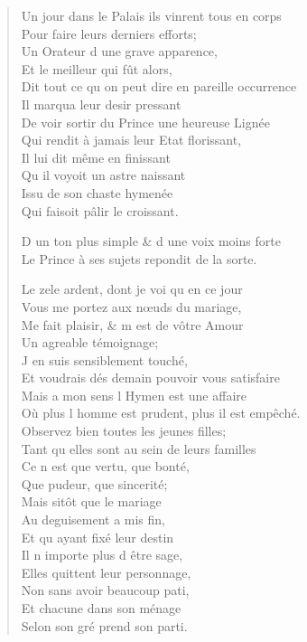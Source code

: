 \begin{verse}
Un jour dans le Palais ils vinrent tous en corps \\
\vin Pour faire leurs derniers efforts; \\
\vin Un Orateur d\textquotesingle{} une grave apparence, \\
\vin Et le meilleur qui fût alors, \\
Dit tout ce qu\textquotesingle{} on peut dire en pareille occurrence \\
\vin Il marqua leur desir pressant \\
De voir sortir du Prince une heureuse Lignée \\
Qui rendit à jamais leur Etat florissant, \\
\vin Il lui dit même en finissant \\
\vin Qu\textquotesingle{} il voyoit un astre naissant \\
\vin Issu de son chaste hymenée \\
\vin Qui faisoit pâlir le croissant.

D\textquotesingle{} un ton plus simple \& d\textquotesingle{} une voix moins forte \\
Le Prince à ses sujets repondit de la sorte.

\vin Le zele ardent, dont je voi qu\textquotesingle{} en ce jour \\
\vin Vous me portez aux nœuds du mariage, \\
\vin Me fait plaisir, \& m\textquotesingle{} est de vôtre Amour \\
\vin Un agreable témoignage; \\
\vin J\textquotesingle{} en suis sensiblement touché, \\
Et voudrais dés demain pouvoir vous satisfaire \\
\vin Mais a mon sens l\textquotesingle{} Hymen est une affaire \\
Où plus l\textquotesingle{} homme est prudent, plus il est empêché. \\
\vin Observez bien toutes les jeunes filles; \\
\vin Tant qu\textquotesingle{} elles sont au sein de leurs familles \\
\vin Ce n\textquotesingle{} est que vertu, que bonté, \\
\vin Que pudeur, que sincerité; \\
\vin Mais sitôt que le mariage \\
\vin Au deguisement a mis fin, \\
\vin Et qu\textquotesingle{} ayant fixé leur destin \\
\vin Il n\textquotesingle{} importe plus d\textquotesingle{} être sage, \\
\vin Elles quittent leur personnage, \\
\vin Non sans avoir beaucoup pati, \\
\vin Et chacune dans son ménage \\
\vin Selon son gré prend son parti.


\end{verse}
